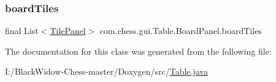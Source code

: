 \subsubsection{\texorpdfstring{boardTiles}{boardTiles}}
{\footnotesize\ttfamily final List$<$\mbox{\hyperlink{classcom_1_1chess_1_1gui_1_1_table_1_1_tile_panel}{Tile\+Panel}}$>$ com.\+chess.\+gui.\+Table.\+Board\+Panel.\+board\+Tiles\hspace{0.3cm}{\ttfamily [package]}}



The documentation for this class was generated from the following file\+:\begin{DoxyCompactItemize}
\item 
I\+:/\+Black\+Widow-\/\+Chess-\/master/\+Doxygen/src/\mbox{\hyperlink{_table_8java}{Table.\+java}}\end{DoxyCompactItemize}
